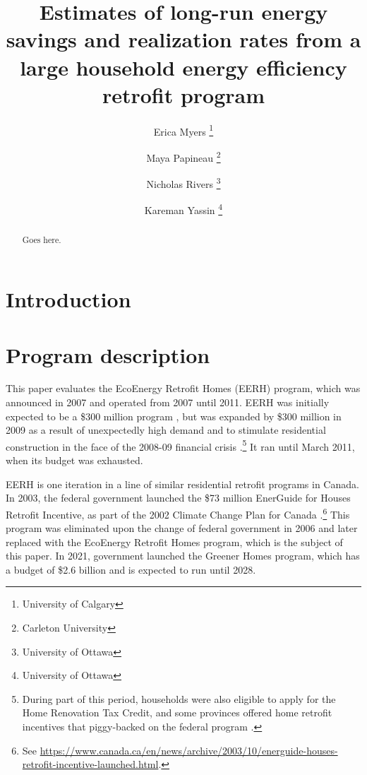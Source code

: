 \documentclass{article}
\author{
    Erica Myers \thanks{University of Calgary}
    \and
    Maya Papineau \thanks{Carleton University}
    \and
    Nicholas Rivers \thanks{University of Ottawa}
    \and 
    Kareman Yassin \thanks{University of Ottawa}
}
\title{
    Estimates of long-run energy savings and realization rates from a large household energy efficiency retrofit program
}
\begin{document}
\maketitle

\begin{abstract}
	Goes here.
\end{abstract}

\section{Introduction}

\section{Program description}
This paper evaluates the EcoEnergy Retrofit Homes (EERH) program, which was announced in 2007 and operated from 2007 until 2011. EERH was initially expected to be a \$300 million program \citep{budget2007}, but was expanded by \$300 million in 2009 as a result of unexpectedly high demand and to stimulate residential construction in the face of the 2008-09 financial crisis \citep{budget2009}.\footnote{During part of this period, households were also eligible to apply for the Home Renovation Tax Credit, and some provinces offered home retrofit incentives that piggy-backed on the federal program \citep{rivers2016free}.} It ran until March 2011, when its budget was exhausted.

EERH is one iteration in a line of similar residential retrofit programs in Canada. In 2003, the federal government launched the \$73 million EnerGuide for Houses Retrofit Incentive, as part of the 2002 Climate Change Plan for Canada \citep{canada2002climateplan}.\footnote{See \url{https://www.canada.ca/en/news/archive/2003/10/energuide-houses-retrofit-incentive-launched.html}.} This program was eliminated upon the change of federal government in 2006 and later replaced with the EcoEnergy Retrofit Homes program, which is the subject of this paper. In 2021, government launched the Greener Homes program, which has a budget of \$2.6 billion and is expected to run until 2028.
\end{document}
